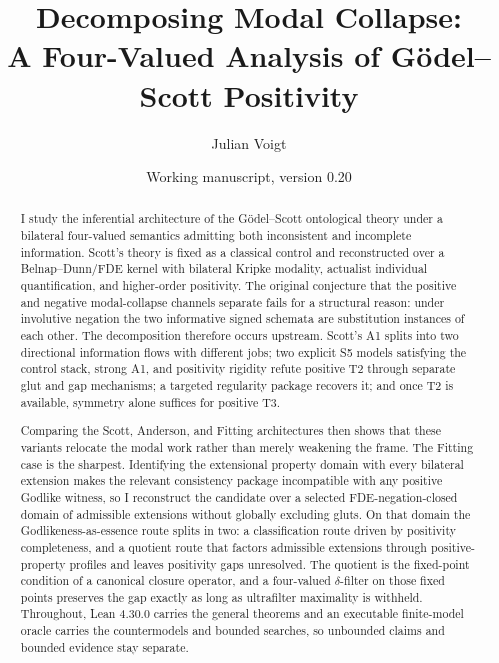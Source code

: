 \documentclass[11pt,a4paper]{article}
\title{Decomposing Modal Collapse:\\A Four-Valued Analysis of G\"odel--Scott Positivity}
\author{Julian Voigt}
\date{Working manuscript, version 0.20}
\theoremstyle{definition}
\begin{document}
\maketitle

\begin{abstract}
I study the inferential architecture of the G\"odel--Scott ontological theory under a bilateral four-valued semantics admitting both inconsistent and incomplete information. Scott's theory is fixed as a classical control and reconstructed over a Belnap--Dunn/FDE kernel with bilateral Kripke modality, actualist individual quantification, and higher-order positivity. The original conjecture that the positive and negative modal-collapse channels separate fails for a structural reason: under involutive negation the two informative signed schemata are substitution instances of each other. The decomposition therefore occurs upstream. Scott's A1 splits into two directional information flows with different jobs; two explicit S5 models satisfying the control stack, strong A1, and positivity rigidity refute positive T2 through separate glut and gap mechanisms; a targeted regularity package recovers it; and once T2 is available, symmetry alone suffices for positive T3.

Comparing the Scott, Anderson, and Fitting architectures then shows that these variants relocate the modal work rather than merely weakening the frame. The Fitting case is the sharpest. Identifying the extensional property domain with every bilateral extension makes the relevant consistency package incompatible with any positive Godlike witness, so I reconstruct the candidate over a selected FDE-negation-closed domain of admissible extensions without globally excluding gluts. On that domain the Godlikeness-as-essence route splits in two: a classification route driven by positivity completeness, and a quotient route that factors admissible extensions through positive-property profiles and leaves positivity gaps unresolved. The quotient is the fixed-point condition of a canonical closure operator, and a four-valued \(\delta\)-filter on those fixed points preserves the gap exactly as long as ultrafilter maximality is withheld. Throughout, Lean 4.30.0 carries the general theorems and an executable finite-model oracle carries the countermodels and bounded searches, so unbounded claims and bounded evidence stay separate.
\end{abstract}

















\appendix




\end{document}
